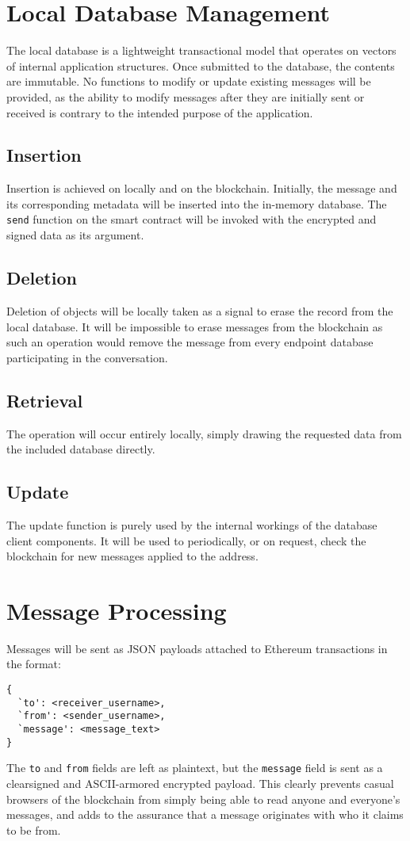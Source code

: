 \documentclass[]{article}
\begin{document}
\section{Local Database Management}
The local database is a lightweight transactional model that operates on vectors of internal application structures. Once submitted to the database, the contents are immutable. No functions to modify or update existing messages will be provided, as the ability to modify messages after they are initially sent or received is contrary to the intended purpose of the application.
\subsection{Insertion}
Insertion is achieved on locally and on the blockchain. Initially, the message and its corresponding metadata will be inserted into the in-memory database. The \verb!send! function on the smart contract will be invoked with the encrypted and signed data as its argument. 
\subsection{Deletion}
Deletion of objects will be locally taken as a signal to erase the record from the local database. It will be impossible to erase messages from the blockchain as such an operation would remove the message from every endpoint database participating in the conversation.
\subsection{Retrieval}
The operation will occur entirely locally, simply drawing the requested data from the included database directly.
\subsection{Update}
The update function is purely used by the internal workings of the database client components. It will be used to periodically, or on request, check the blockchain for new messages applied to the address.

\section{Message Processing}
Messages will be sent as JSON payloads attached to Ethereum transactions in the format:
\begin{verbatim}
{
  `to': <receiver_username>,
  `from': <sender_username>,
  `message': <message_text>
}
\end{verbatim}
The \verb!to! and \verb!from! fields are left as plaintext, but the \verb!message! field is sent as a clearsigned and ASCII-armored encrypted payload. This clearly prevents casual browsers of the blockchain from simply being able to read anyone and everyone's messages, and adds to the assurance that a message originates with who it claims to be from.
\end{document}
